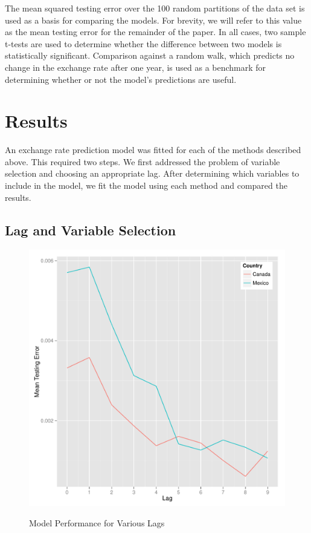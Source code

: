 \documentclass{sig-alternate-05-2015}
\begin{document}
\par{} The mean squared testing error over the 100 random partitions of the data set is used as a basis for comparing the models. For brevity, we will refer to this value as the mean testing error for the remainder of the paper. In all cases, two sample t-tests are used to determine whether the difference between two models is statistically significant. Comparison against a random walk, which predicts no change in the exchange rate after one year, is used as a benchmark for determining whether or not the model's predictions are useful.

\section{Results}

An exchange rate prediction model was fitted for each of the methods described above. This required two steps. We first addressed the problem of variable selection and choosing an appropriate lag. After determining which variables to include in the model, we fit the model using each method and compared the results.

\subsection{Lag and Variable Selection}


\begin{figure}
\centering
\caption{Model Performance for Various Lags}
\includegraphics[scale=0.45]{lag1.pdf}
\label{fig:lag1}
\end{figure}
\end{document}
